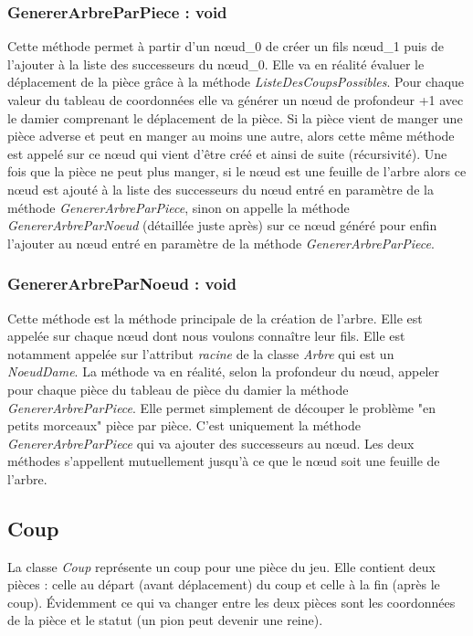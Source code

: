 \documentclass[12,french]{report}
\begin{document}
\subsubsection{GenererArbreParPiece : void}

Cette méthode permet à partir d'un nœud\_0 de créer un fils nœud\_1 puis de l'ajouter à la liste des successeurs du nœud\_0. Elle va en réalité évaluer le déplacement de la pièce grâce à la méthode \textit{ListeDesCoupsPossibles}. Pour chaque valeur du tableau de coordonnées elle va générer un nœud de profondeur +1 avec le damier comprenant le déplacement de la pièce. Si la pièce vient de manger une pièce adverse et peut en manger au moins une autre, alors cette même méthode est appelé sur ce nœud qui vient d'être créé et ainsi de suite (récursivité). Une fois que la pièce ne peut plus manger, si le nœud est une feuille de l'arbre alors ce nœud est ajouté à la liste des successeurs du nœud entré en paramètre de la méthode \textit{GenererArbreParPiece}, sinon on appelle la méthode \textit{GenererArbreParNoeud} (détaillée juste après) sur ce nœud généré pour enfin l'ajouter au nœud entré en paramètre de la méthode \textit{GenererArbreParPiece}. 

\subsubsection{GenererArbreParNoeud : void}

Cette méthode est la méthode principale de la création de l'arbre. Elle est appelée sur chaque nœud dont nous voulons connaître leur fils. Elle est notamment appelée sur l'attribut \textit{racine} de la classe \textit{Arbre} qui est un \textit{NoeudDame}. La méthode va en réalité, selon la profondeur du nœud, appeler pour chaque pièce du tableau de pièce du damier la méthode \textit{GenererArbreParPiece}. Elle permet simplement de découper le problème "en petits morceaux" pièce par pièce. C'est uniquement la méthode \textit{GenererArbreParPiece} qui va ajouter des successeurs au nœud. Les deux méthodes s'appellent mutuellement jusqu'à ce que le nœud soit une feuille de l'arbre.

\subsection{Coup}

La classe \textit{Coup} représente un coup pour une pièce du jeu. Elle  contient deux pièces : celle au départ (avant déplacement) du coup et celle à la fin (après le coup). Évidemment ce qui va changer entre les deux pièces sont les coordonnées de la pièce et le statut (un pion peut devenir une reine).
\end{document}

